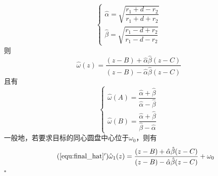 \documentclass{article}
\newenvironment{SOLUTION}[1][{}]{{\noindent\heiti 解#1：}}{\hfill $\square$\par}
\begin{document}
\begin{SOLUTION}
\begin{equation}
            \begin{cases}
                \hat{\alpha} = \sqrt{\dfrac{r_1+d-r_2}{r_1+d+r_2}}\\
                \hat{\beta} = \sqrt{\dfrac{r_1-d+r_2}{r_1-d-r_2}}
            \end{cases}
        \end{equation}
        则
        \newcommand{\halpha}{\hat{\alpha}}
        \newcommand{\hbeta}{\hat{\beta}}
        \begin{equation}
            \hat{\omega}(z)=\dfrac{(z-B)+\hat{\alpha}\hat{\beta}(z-C)}{(z-B)-\halpha\hbeta(z-C)}
            \label{equ:final_hat}
        \end{equation}
        且有
        $$
        \begin{cases}
            \hat{\omega}(A)=\dfrac{\halpha+\hbeta}{\halpha-\hbeta}\\
            \hat{\omega}(B)=\dfrac{\halpha+\hbeta}{\hbeta-\halpha}
        \end{cases}
        $$
        一般地，若要求目标的同心圆盘中心位于$\omega_0$，则有
        \begin{equation}
            \tag{\ref{equ:final_hat}$'$}
            \hat{\omega}_1(z)=\dfrac{(z-B)+\halpha\hbeta(z-C)}{(z-B)-\halpha\hbeta(z-C)}+\omega_0
        \end{equation}
\end{SOLUTION}
    
\end{document}
